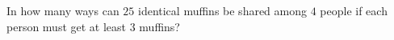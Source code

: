 In how many ways can $25$ identical muffins be shared among $4$ people if each person must get at least $3$ muffins?
